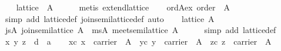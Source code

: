 \begin{isabellebody}
\ \ \isamarkupfalse%
\ {}lattice\ {}{}\ A{}{}\isanewline
\ \ \ \ \isamarkupfalse%
\ {}metis\ extend{}lattice{}\isanewline
\ \ \isamarkupfalse%
\ ord{}A{}ex{}\ {}order\ {}{}\ A{}{}\isanewline
\ \ \ \ \isamarkupfalse%
\ {}simp\ add{}\ lattice{}def\ join{}semilattice{}def{}\ auto{}\isanewline
\ \ \isamarkupfalse%
\ {}lattice\ A{}\ \isamarkupfalse%
\ js{}A{}\ {}join{}semilattice\ A{}\ \ ms{}A{}\ {}meet{}semilattice\ A{}\isanewline
\ \ \ \ \isamarkupfalse%
\ {}simp\ add{}\ lattice{}def{}{}\isanewline
\isanewline
\ \ \isamarkupfalse%
\ x\ y\ z\ {}{}\ {}{}d\ {}\ {}a{}\isanewline
\ \ \isamarkupfalse%
\ xc{}\ {}x\ {}\ carrier\ {}{}\ A{}{}\ \ yc{}\ {}y\ {}\ carrier\ {}{}\ A{}{}\ \ zc{}\ {}z\ {}\ carrier\ {}{}\ A{}{}\isanewline

\end{isabellebody}
